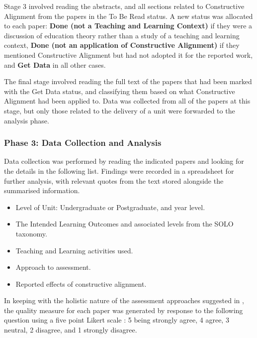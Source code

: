 Stage 3 involved reading the abstracts, and all sections related to Constructive Alignment from the papers in the To Be Read status. A new status was allocated to each paper: \textbf{Done (not a Teaching and Learning Context)} if they were a discussion of education theory rather than a study of a teaching and learning context, \textbf{Done (not an application of Constructive Alignment)} if they mentioned Constructive Alignment but had not adopted it for the reported work, and \textbf{Get Data} in all other cases.

The final stage involved reading the full text of the papers that had been marked with the Get Data status, and classifying them based on what Constructive Alignment had been applied to. Data was collected from all of the papers at this stage, but only those related to the delivery of a unit were forwarded to the analysis phase.


\subsubsection{Phase 3: Data Collection and Analysis} %
\label{ssub:data_collection_and_analysis}

Data collection was performed by reading the indicated papers and looking for the details in the following list. Findings were recorded in a spreadsheet for further analysis, with relevant quotes from the text stored alongside the summarised information.

\begin{itemize}[noitemsep,nolistsep]
	\item Level of Unit: Undergraduate or Postgraduate, and year level.
	\item The Intended Learning Outcomes and associated levels from the SOLO taxonomy.
	\item Teaching and Learning activities used.
	\item Approach to assessment.
	\item Reported effects of constructive alignment.
\end{itemize}

In keeping with the holistic nature of the assessment approaches suggested in \cite{Biggs:1997}, the quality measure for each paper was generated by response to the following question using a five point Likert scale \cite{Likert:1932}: 5 being strongly agree, 4 agree, 3 neutral, 2 disagree, and 1 strongly disagree.

